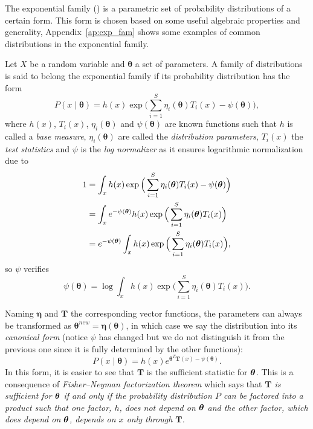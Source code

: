 
The exponential family (\cite{koopman1936distributions}) is a parametric set of probability distributions of a certain form. This form is chosen based on some useful algebraic properties and generality, Appendix~\ref{ap:exp_fam} shows some examples of common distributions in the exponential family.

Let \(X\) be a random variable and \(\bm{\theta}\) a set of parameters. A family of distributions is said to belong the exponential family if its probability distribution has the form
\[
  P(x \mid \bm{\theta}) = h(x)\exp{\Big( \sum_{i=1}^{S} \eta_{i}(\bm{\theta})T_{i}(x) - \psi(\bm{\theta}) \Big)},
\]
where \(h(x)\), \(T_{i}(x)\), \(\eta_{i}(\bm{\theta})\) and \(\psi(\bm{\theta})\)  are known functions such that \(h\) is called a \emph{base measure}, \(\eta_{i}(\bm{\theta})\) are called the \emph{distribution parameters},  \(T_{i}(x)\) the \emph{test statistics} and \(\psi\) is the \emph{log normalizer} as it ensures logarithmic normalization due to
\[
  \begin{aligned}
    1 &= \int_{x}  h(x)\exp{\Big( \sum_{i=1}^{S} \eta_{i}(\bm{\theta})T_{i}(x) - \psi(\bm{\theta}) \Big)}\\
    &= \int_{x} e^{-\psi(\bm{\theta})} h(x)\exp{\Big( \sum_{i=1}^{S} \eta_{i}(\bm{\theta})T_{i}(x) \Big)}\\
    &= e^{-\psi(\bm{\theta})} \int_{x} h(x)\exp{\Big( \sum_{i=1}^{S} \eta_{i}(\bm{\theta})T_{i}(x) \Big)},
  \end{aligned}
\]
so \(\psi\) verifies
\[
      \psi(\bm{\theta}) = \log \int_{x} h(x) \exp \Big( \sum_{i=1}^{S} \eta_{i}(\bm{\theta})T_{i}(x) \Big).
\]

Naming \(\bm{\eta}\) and \(\bm{T}\) the corresponding vector functions, the parameters can always be transformed as \(\bm{\theta}^{new} = \bm{\eta}(\bm{\theta})\), in which case we say the distribution into its \emph{canonical form} (notice \(\psi\) has changed but we do not distinguish it from the previous one since it is fully determined by the other functions):
\[
  P(x \mid \bm{\theta}) = h(x) e^{\bm{\theta}^{T}\bm{T}(x) - \psi(\bm{\theta})}.
\]
In this form, it is easier to see that \(\bm{T}\) is the sufficient statistic for \(\bm{\theta}\). This is a consequence of \emph{Fisher–Neyman factorization theorem} which says that \textit{\(\bm{T}\) is sufficient for \(\bm{\theta}\)  if and only if the probability distribution \(P\)  can be factored into a product such that one factor, \(h\), does not depend on \(\bm{\theta}\)  and the other factor, which does depend on \(\bm{\theta}\), depends on \(x\)  only through \(\bm{T}\).}

